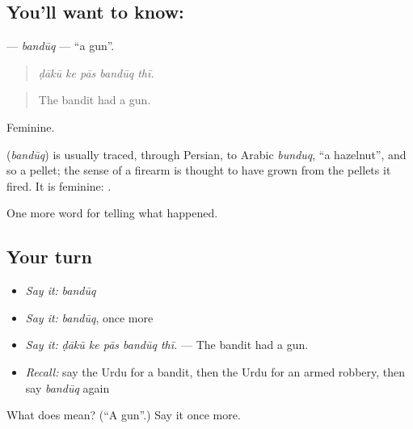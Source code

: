 \subsection*{You'll want to know: }
\textbf{} — \emph{bandūq} — \textquotedblleft{}a gun\textquotedblright{}.

\begin{quote}
    
\end{quote}

\begin{quote}
\emph{ḍākū ke pās bandūq thī.}
\end{quote}

\begin{quote}
The bandit had a gun.
\end{quote}

Feminine.

\begin{cousinweb}
\textbf{} (\emph{bandūq}) is usually traced, through Persian, to Arabic \emph{bunduq}, \textquotedblleft{}a hazelnut\textquotedblright{}, and so a pellet; the sense of a firearm is thought to have grown from the pellets it fired. It is feminine: \textbf{ }.
\end{cousinweb}

\begin{grammarlens}[title={What you've built}]
One more word for telling what happened.
\end{grammarlens}

\subsection*{Your turn}
\begin{itemize}
\raggedright
  \item \emph{Say it:} \emph{bandūq}
  \item \emph{Say it:} \emph{bandūq}, once more
  \item \emph{Say it:} \emph{ḍākū ke pās bandūq thī.} — The bandit had a gun.
  \item \emph{Recall:} say the Urdu for a bandit, then the Urdu for an armed robbery, then say \emph{bandūq} again
\end{itemize}

\begin{tcolorbox}[breakable,colback=teal!4,colframe=teal!35!black,title={Before you move on}]
What does  mean? (\textquotedblleft{}A gun\textquotedblright{}.) Say it once more.
\end{tcolorbox}
